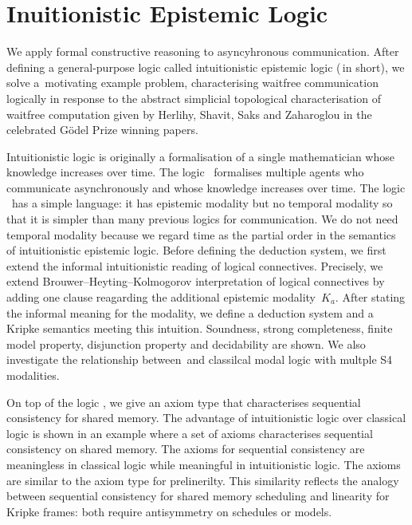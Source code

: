 \chapter{Inuitionistic Epistemic Logic}


We apply formal constructive reasoning to
 asyncyhronous communication.
After defining a general-purpose logic called
intuitionistic epistemic logic (\iec\,in
 short), 
we solve a~motivating example problem,
 characterising waitfree communication logically in response to the
 abstract simplicial topological characterisation of
 waitfree computation given by Herlihy, Shavit, Saks and Zaharoglou 
in the celebrated G\"odel Prize winning papers.

 Intuitionistic logic is originally a formalisation of a single mathematician whose
 knowledge
 increases over time.  The logic \iec\, formalises multiple agents who communicate
 asynchronously and whose knowledge increases over time.  
The logic \iec\, has a simple language: 
 it has epistemic modality but no temporal modality
 so that it is simpler than many previous logics for communication.
 We do not need temporal modality because 
we regard time as 
the partial order in the semantics of intuitionistic epistemic logic.
 Before defining the deduction system, we first extend the informal intuitionistic
 reading of logical connectives.
 Precisely, 
 we extend Brouwer--Heyting--Kolmogorov interpretation of logical connectives
 by adding one clause reagarding the additional epistemic modality~$K_a$.
 After stating the informal meaning for the modality,
 we define a deduction system and a Kripke semantics meeting this intuition.
 Soundness, strong completeness, finite
 model property, disjunction property and decidability are
 shown. 
We also investigate the relationship between \iec\,and classilcal modal logic with multple
 S4 modalities.

On top of the logic \iec, we give an axiom type that characterises
 sequential consistency for shared memory.
 The advantage of intuitionistic logic over classical logic is shown
 in an example where a set of axioms characterises 
 sequential consistency on shared memory.
 The axioms for sequential consistency are
 meaningless in classical logic while
 meaningful in intuitionistic logic.
 The axioms are similar to 
 the axiom type for prelinerilty.
 This similarity reflects the analogy 
 between sequential consistency for shared memory scheduling 
 and linearity for Kripke frames: both require antisymmetry on schedules or models.

